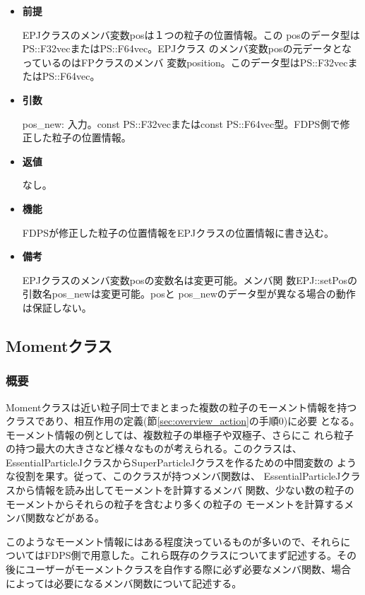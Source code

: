\begin{itemize}

\item {\bf 前提}
  
  EPJクラスのメンバ変数posは１つの粒子の位置情報。この
  posのデータ型はPS::F32vecまたはPS::F64vec。EPJクラス
  のメンバ変数posの元データとなっているのはFPクラスのメンバ
  変数position。このデータ型はPS::F32vecまたはPS::F64vec。

\item {\bf 引数}

  pos\_new: 入力。const PS::F32vecまたはconst PS::F64vec型。FDPS側で修
  正した粒子の位置情報。

\item {\bf 返値}

  なし。
  
\item {\bf 機能}

  FDPSが修正した粒子の位置情報をEPJクラスの位置情報に書き込む。

\item {\bf 備考}

  EPJクラスのメンバ変数posの変数名は変更可能。メンバ関
  数EPJ::setPosの引数名pos\_newは変更可能。posと
  pos\_newのデータ型が異なる場合の動作は保証しない。

\end{itemize}

\subsection{Momentクラス}
\label{sec:example_moment}

\subsubsection{概要}

Momentクラスは近い粒子同士でまとまった複数の粒子のモーメント情報を持つ
クラスであり、相互作用の定義(節\ref{sec:overview_action}の手順0)に必要
となる。モーメント情報の例としては、複数粒子の単極子や双極子、さらにこ
れら粒子の持つ最大の大きさなど様々なものが考えられる。このクラスは、
EssentialParticleJクラスからSuperParticleJクラスを作るための中間変数の
ような役割を果す。従って、このクラスが持つメンバ関数は、
EssentialParticleJクラスから情報を読み出してモーメントを計算するメンバ
関数、少ない数の粒子のモーメントからそれらの粒子を含むより多くの粒子の
モーメントを計算するメンバ関数などがある。

このようなモーメント情報にはある程度決っているものが多いので、それらに
ついてはFDPS側で用意した。これら既存のクラスについてまず記述する。その
後にユーザーがモーメントクラスを自作する際に必ず必要なメンバ関数、場合
によっては必要になるメンバ関数について記述する。


